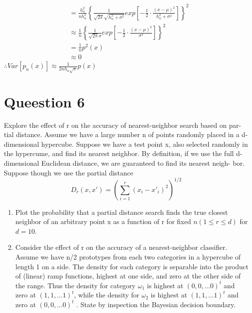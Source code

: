\documentclass[a4paper,11pt,onecolumn,oneside,UTF8]{article}
\begin{document}
\begin{enumerate}
$$\begin{aligned}
                   & = \frac{h_n^2}{nh_n^2}\left\{\frac{1}{\sqrt{2\pi}\sqrt{h_n^2+\sigma^2}}
                  exp\left[-\frac{1}{2}\cdot\frac{\left(x-\mu\right)^2}{h_n^2+\sigma^2}\right]
                  \right\}^2                                                                          \\
                   & \approx \frac{1}{n} \left\{\frac{1}{\sqrt{2\pi}\sigma}
                  exp\left[-\frac{1}{2}\cdot\frac{\left(x-\mu\right)^2}{\sigma^2}\right]\right\}^2    \\
                   & = \frac{1}{n}p^2\left(x\right)                                                   \\
                   & \approx 0
              \end{aligned}
          $$
          $\therefore Var\left[p_n\left(x\right)\right] \approx \frac{1}{2nh_n\sqrt\pi}p\left(x\right)$
\end{enumerate}


\section*{Queestion 6}
Explore the effect of r on the accuracy of nearest-neighbor search based on par-
tial distance. Assume we have a large number n of points randomly placed in a d-
dimensional hypercube. Suppose we have a test point x, also selected randomly
in the hypercume, and find its nearest neighbor. By definition, if we use the full
d-dimensional Euclidean distance, we are guaranteed to find its nearest neigh-
bor. Suppose though we use the partial distance
$$
    D_r\left(x,x'\right) = \left(\sum\limits_{i=1}^r\left(x_i-x'_i\right)^2\right)^{1/2}
$$
\begin{enumerate}
    \item Plot the probability that a partial distance search finds the true closest neighbor of
          an arbitrary point x as a function of r for fixed $ n \left(1 \leq r \leq d\right)$
          for $d = 10$.
    \item Consider the effect of r on the accuracy of a nearest-neighbor classifier. Assume we
          have n/2 prototypes from each two categories in a hypercube of length 1 on a side.
          The density for each category is separable into the product of (linear) ramp functions,
          highest at one side, and zero at the other side of the range. Thus the density for category
          $\omega_1$  is highest at $\left(0,0,...0\right)^t$  and zero at $\left(1,1,...1\right)^t$,
          while the density for $\omega_2$ is highest at $\left(1,1,...1\right)^t$ and zero at
          $\left(0,0,...0\right)^t$ . State by inspection the Bayesian decision boundary.
\end{enumerate}
\end{document}
